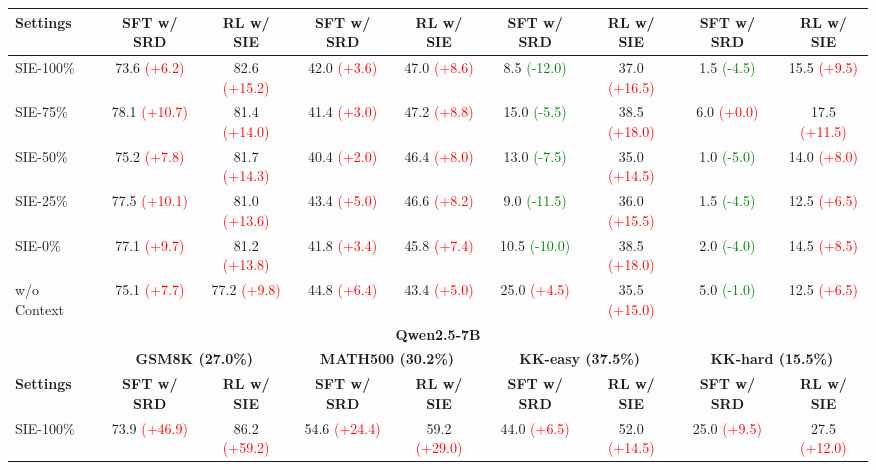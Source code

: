 \documentclass{article} %
\newcommand{\posgain}[1]{\textcolor{red}{(+#1)}}
\newcommand{\neggain}[1]{\textcolor{green}{(-#1)}}
\begin{document}
\begin{table}[t!]
{\begin{tabular}{l cc cc cc cc}
\cmidrule(lr){2-3} \cmidrule(lr){4-5} \cmidrule(lr){6-7} \cmidrule(lr){8-9}
\textbf{Settings} & \textbf{SFT w/ SRD} & \textbf{RL w/ SIE} & \textbf{SFT w/ SRD} & \textbf{RL w/ SIE} & \textbf{SFT w/ SRD} & \textbf{RL w/ SIE} & \textbf{SFT w/ SRD} & \textbf{RL w/ SIE} \\
\midrule
SIE-100\% & 73.6 \posgain{6.2} & 82.6 \posgain{15.2} & 42.0 \posgain{3.6} & 47.0 \posgain{8.6} & 8.5 \neggain{12.0} & 37.0 \posgain{16.5} & 1.5 \neggain{4.5} & 15.5 \posgain{9.5}  \\
SIE-75\% & 78.1 \posgain{10.7} & 81.4 \posgain{14.0} & 41.4 \posgain{3.0} & 47.2 \posgain{8.8} & 15.0 \neggain{5.5} & 38.5 \posgain{18.0} & 6.0 \posgain{0.0} & 17.5 \posgain{11.5} \\
SIE-50\% & 75.2 \posgain{7.8} & 81.7 \posgain{14.3} & 40.4 \posgain{2.0} & 46.4 \posgain{8.0} & 13.0 \neggain{7.5} & 35.0 \posgain{14.5} & 1.0 \neggain{5.0} & 14.0 \posgain{8.0}  \\
SIE-25\%       & 77.5 \posgain{10.1} & 81.0 \posgain{13.6} & 43.4 \posgain{5.0} & 46.6 \posgain{8.2} & 9.0 \neggain{11.5} & 36.0 \posgain{15.5} & 1.5 \neggain{4.5} & 12.5 \posgain{6.5}  \\
SIE-0\%       & 77.1 \posgain{9.7} & 81.2 \posgain{13.8} & 41.8 \posgain{3.4} & 45.8 \posgain{7.4} & 10.5 \neggain{10.0} & 38.5 \posgain{18.0} & 2.0 \neggain{4.0} & 14.5 \posgain{8.5}  \\
w/o Context & 75.1 \posgain{7.7} & 77.2 \posgain{9.8}  & 44.8 \posgain{6.4} & 43.4 \posgain{5.0} & 25.0 \posgain{4.5} & 35.5 \posgain{15.0} & 5.0 \neggain{1.0} & 12.5 \posgain{6.5}  \\
\midrule[1.5pt] %
\multicolumn{9}{c}{\large\textbf{Qwen2.5-7B}} \\
\midrule
& \multicolumn{2}{c}{\textbf{GSM8K (27.0\%)}} & \multicolumn{2}{c}{\textbf{MATH500 (30.2\%)}} & \multicolumn{2}{c}{\textbf{KK-easy (37.5\%)}} & \multicolumn{2}{c}{\textbf{KK-hard (15.5\%)}} \\
\cmidrule(lr){2-3} \cmidrule(lr){4-5} \cmidrule(lr){6-7} \cmidrule(lr){8-9}
\textbf{Settings} & \textbf{SFT w/ SRD} & \textbf{RL w/ SIE} & \textbf{SFT w/ SRD} & \textbf{RL w/ SIE} & \textbf{SFT w/ SRD} & \textbf{RL w/ SIE} & \textbf{SFT w/ SRD} & \textbf{RL w/ SIE} \\
\midrule
SIE-100\% & 73.9 \posgain{46.9} & 86.2 \posgain{59.2} & 54.6 \posgain{24.4} & 59.2 \posgain{29.0} & 44.0 \posgain{6.5} & 52.0 \posgain{14.5} & 25.0 \posgain{9.5} & 27.5 \posgain{12.0} \\

\end{tabular}}
\end{table}
\end{document}
